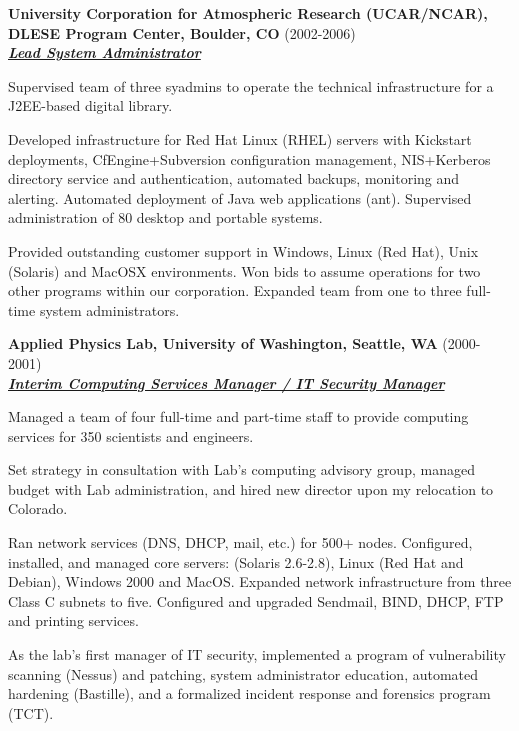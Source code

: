 \documentclass{article}
\newcommand{\employer}[3]{{ \textbf{#1} (#2)\\ \underline{\textbf{\emph{#3}}}\\ \nopagebreak }}
\newenvironment{achievements}{\begin{list}{\topsep 0pt \itemsep -2pt}} {\vspace*{4pt}\end{list}}
\begin{document}
\employer{University Corporation for Atmospheric Research (UCAR/NCAR), DLESE Program Center, Boulder, CO}{2002-2006}{Lead System Administrator}
\begin{achievements}
    \item Supervised team of three syadmins to operate the technical infrastructure for a J2EE-based digital library.
    \item Developed infrastructure for Red Hat Linux (RHEL) servers with Kickstart deployments, CfEngine+Subversion configuration management, NIS+Kerberos directory service and authentication, automated backups, monitoring and alerting. Automated deployment of Java web applications (ant). Supervised administration of 80 desktop and portable systems.
    \item Provided outstanding customer support in Windows, Linux (Red Hat), Unix (Solaris) and MacOSX environments. Won bids to assume operations for two other programs within our corporation. Expanded team from one to three full-time system administrators.
\end{achievements}


\employer{Applied Physics Lab, University of Washington, Seattle, WA}{2000-2001}{Interim Computing Services Manager / IT Security Manager}
\begin{achievements}
    \item Managed a team of four full-time and part-time staff to provide computing services for 350 scientists and engineers.
    \item Set strategy in consultation with Lab's computing advisory group, managed budget with Lab administration, and hired new director upon my relocation to Colorado.
    \item Ran network services (DNS, DHCP, mail, etc.) for 500+ nodes. Configured, installed, and managed core servers: (Solaris 2.6-2.8), Linux (Red Hat and Debian), Windows 2000 and MacOS.  Expanded network infrastructure from three Class C subnets to five. Configured and upgraded Sendmail, BIND, DHCP, FTP and printing services.
    \item As the lab's first manager of IT security, implemented a program of vulnerability scanning (Nessus) and patching, system administrator education, automated hardening (Bastille), and a formalized incident response and forensics program (TCT).
\end{achievements}
\end{document}
